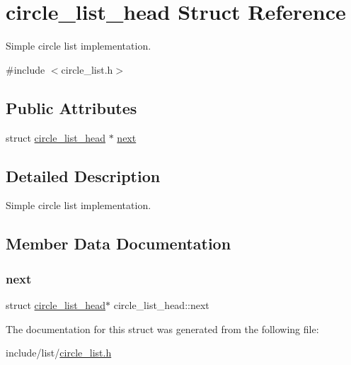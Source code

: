\hypertarget{structcircle__list__head}{}\section{circle\+\_\+list\+\_\+head Struct Reference}
\label{structcircle__list__head}


Simple circle list implementation.  




{\ttfamily \#include $<$circle\+\_\+list.\+h$>$}

\subsection*{Public Attributes}
\begin{DoxyCompactItemize}
\item 
struct \mbox{\hyperlink{structcircle__list__head}{circle\+\_\+list\+\_\+head}} $\ast$ \mbox{\hyperlink{structcircle__list__head_a5e0fb91efe71aae21425281ee28e2b01}{next}}
\end{DoxyCompactItemize}


\subsection{Detailed Description}
Simple circle list implementation. 

\subsection{Member Data Documentation}
\mbox{\label{structcircle__list__head_a5e0fb91efe71aae21425281ee28e2b01}} 
\subsubsection{\texorpdfstring{next}{next}}
{\footnotesize\ttfamily struct \mbox{\hyperlink{structcircle__list__head}{circle\+\_\+list\+\_\+head}}$\ast$ circle\+\_\+list\+\_\+head\+::next}



The documentation for this struct was generated from the following file\+:\begin{DoxyCompactItemize}
\item 
include/list/\mbox{\hyperlink{circle__list_8h}{circle\+\_\+list.\+h}}\end{DoxyCompactItemize}
